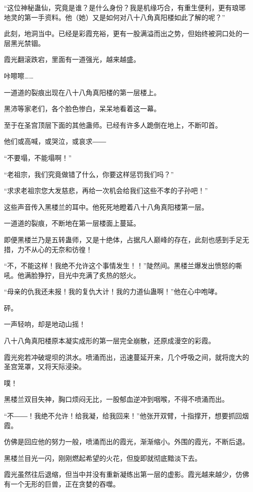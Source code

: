 \begin{this_body}
“这位神秘蛊仙，究竟是谁？是什么身份？我是机缘巧合，有重生便利，更有琅琊地灵的第一手资料。他（她）又是如何对八十八角真阳楼如此了解的呢？”

此刻，地洞当中。已经是彩霞充裕，更有一股满溢而出之势，但始终被洞口处的一层黑光禁锢。

霞光翻滚跌宕，里面有一道强光，越来越盛。

咔嚓嚓……

一道道的裂痕出现在八十八角真阳楼的第一层楼上。

黑沛等家老们，各个脸色惨白，呆呆地看着这一幕。

至于在圣宫顶层下面的其他蛊师。已经有许多人跪倒在地上，不断叩首。

他们或高喊，或哭泣，或哀求――

“不要塌，不能塌啊！”

“老祖宗，我们究竟做错了什么，你要这样惩罚我们吗？”

“求求老祖宗您大发慈悲，再给一次机会给我们这些不孝的子孙吧！”

这些声音传入黑楼兰的耳中。他死死地瞪着八十八角真阳楼第一层。

一道道的裂痕，不断地在第一层楼面上蔓延。

即便黑楼兰乃是五转蛊师，又是十绝体，占据凡人巅峰的存在，此刻也感到手足无措，力不从心的无奈和彷徨！

“不，不能这样！我绝不允许这个事情发生！！”陡然间。黑楼兰爆发出愤怒的嘶吼。他满脸狰狞，目光中充满了炙热的怒火。

“母亲的仇我还未报！我的复仇大计！我的力道仙蛊啊！”他在心中咆哮。

砰。

一声轻响，却是地动山摇！

八十八角真阳楼原本凝实成形的第一层完全崩散，还原成漫空的彩霞。

霞光宛若冲破堤坝的洪水。喷涌而出，迅速蔓延开来，几个呼吸之间，就将庞大的圣宫笼罩，又将天际浸染。

噗！

黑楼兰双目失神，胸口烦闷无比，一股郁血逆冲到咽喉，不得不喷涌而出。

“不――！我绝不允许！给我凝，给我回来！”他张开双臂，十指撑开，想要抓回烟霞。

仿佛是回应他的努力一般，喷涌而出的霞光，渐渐缩小。外围的霞光，不断后退。

黑楼兰目光一闪，刚刚燃起希望的火花，但旋即就彻底黯淡下去。

霞光虽然往后退缩，但当中并没有重新凝练出第一层的虚影。霞光越来越少，仿佛有一个无形的巨兽，正在贪婪的吞噬。


\end{this_body}
